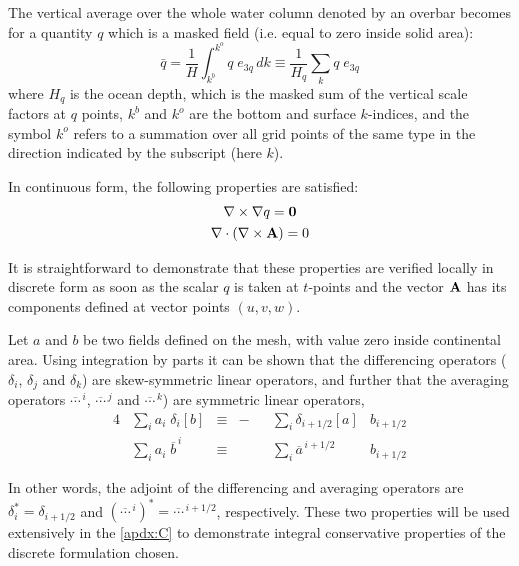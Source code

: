\documentclass[../main/NEMO_manual]{subfiles}
\begin{document}
The vertical average over the whole water column denoted by an overbar becomes for a quantity $q$ which
is a masked field (i.e. equal to zero inside solid area):
\begin{equation}
  \label{eq:DOM_bar}
  \bar q = \frac{1}{H} \int_{k^b}^{k^o} q \; e_{3q} \, dk \equiv \frac{1}{H_q} \sum \limits_k q \; e_{3q}
\end{equation}
where $H_q$  is the ocean depth, which is the masked sum of the vertical scale factors at $q$ points,
$k^b$ and $k^o$ are the bottom and surface $k$-indices, and the symbol $k^o$ refers to a summation over
all grid points of the same type in the direction indicated by the subscript (here $k$).

In continuous form, the following properties are satisfied:
\begin{gather}
  \label{eq:DOM_curl_grad}
  \nabla \times \nabla q = \mathbf{0} \\
  \label{eq:DOM_div_curl}
  \nabla \cdot (\nabla \times \mathbf{A}) = 0
\end{gather}

It is straightforward to demonstrate that these properties are verified locally in discrete form as soon as
the scalar $q$ is taken at $t$-points and the vector $\mathbf{A}$ has its components defined at
vector points $(u,v,w)$.

Let $a$ and $b$ be two fields defined on the mesh, with value zero inside continental area.
Using integration by parts it can be shown that the differencing operators ($\delta_i$, $\delta_j$ and $\delta_k$)
are skew-symmetric linear operators, and further that the averaging operators $\overline{\cdots}^{\, i}$,
$\overline{\cdots}^{\, j}$ and $\overline{\cdots}^{\, k}$) are symmetric linear operators, \ie
\begin{alignat}{4}
  \label{eq:DOM_di_adj}
  &\sum \limits_i a_i \; \delta_i [b]      &\equiv &- &&\sum \limits_i \delta      _{   i + 1/2} [a] &b_{i + 1/2} \\
  \label{eq:DOM_mi_adj}
  &\sum \limits_i a_i \; \overline b^{\, i} &\equiv &  &&\sum \limits_i \overline a ^{\, i + 1/2}     &b_{i + 1/2}
\end{alignat}

In other words, the adjoint of the differencing and averaging operators are $\delta_i^* = \delta_{i + 1/2}$ and 
$(\overline{\cdots}^{\, i})^* = \overline{\cdots}^{\, i + 1/2}$, respectively.
These two properties will be used extensively in the \autoref{apdx:C} to
demonstrate integral conservative properties of the discrete formulation chosen.
\end{document}
